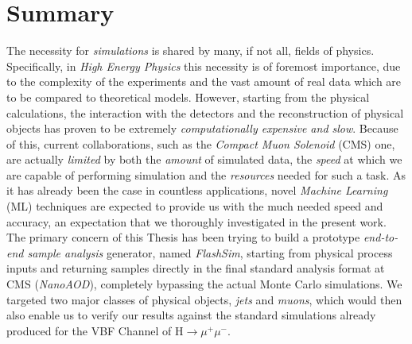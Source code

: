 \begingroup
\let\clearpage\relax
\let\cleardoublepage\relax
\let\cleardoublepage\relax

\chapter*{Summary}
The necessity for \emph{simulations} is shared by many, if not all, fields of physics. Specifically, in \emph{High Energy Physics} this necessity is of foremost importance, due to the complexity of the experiments and the vast amount of real data which are to be compared to theoretical models. However, starting from the physical calculations, the interaction with the detectors and the reconstruction of physical objects has proven to be extremely \emph{computationally expensive and slow}. Because of this, current collaborations, such as the \emph{Compact Muon Solenoid} (CMS) one, are actually \emph{limited} by both the \emph{amount} of simulated data, the \emph{speed} at which we are capable of performing simulation and the \emph{resources} needed for such a task. As it has already been the case in countless applications, novel \emph{Machine Learning} (ML) techniques are expected to provide us with the much needed speed and accuracy, an expectation that we thoroughly investigated in the present work. The primary concern of this Thesis has been trying to build a prototype \emph{end-to-end sample analysis} generator, named \emph{FlashSim}, starting from physical process inputs and returning samples directly in the final standard analysis format at CMS (\emph{NanoAOD}), completely bypassing the actual Monte Carlo simulations. We targeted two major classes of physical objects, \emph{jets} and \emph{muons}, which would then also enable us to verify our results against the standard simulations already produced for the VBF Channel of H$\rightarrow\mu^+\mu^-$.


